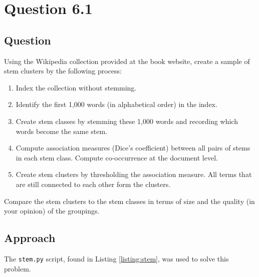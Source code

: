 \section{Question 6.1}

\subsection{Question}
Using the Wikipedia collection provided at the book website, create a sample
of stem clusters by the following process:
\begin{enumerate}
    \item Index the collection without stemming.
    \item Identify the first 1,000 words (in alphabetical order) in the index.
    \item Create stem classes by stemming these 1,000 words and recording which words become the same stem.
    \item Compute association measures (Dice's coefficient) between all pairs of stems in each stem class. Compute co-occurrence at the document level.
    \item Create stem clusters by thresholding the association measure. All terms that are still connected to each other form the clusters.
\end{enumerate}

Compare the stem clusters to the stem classes in terms of size and the quality (in
your opinion) of the groupings.

\subsection{Approach}
The \texttt{stem.py} script, found in Listing \ref{listing:stem}, was used to solve this problem.
